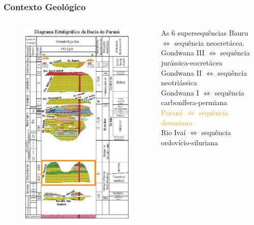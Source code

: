 \documentclass[aspectratio=10]{beamer} %
\begin{document}
\begin{frame}
\frametitle{Contexto Geológico}
\begin{columns}
\begin{column}{0.4\textwidth}
\begin{figure}
\includegraphics[scale=0.36]{Imagens/diagramaparana.png}
\end{figure}
\end{column}
\begin{column}{0.55\textwidth}
\begin{block}{As $6$ supersequências}
Bauru $\Longleftrightarrow$  sequência neocretácea.\\
Gondwana III $\Longleftrightarrow$ sequência jurássica-eocretácea\\
Gondwana II $\Longleftrightarrow$ sequência neotriássica \\
Gondwana I $\Longleftrightarrow$ sequência carbonífera-permiana\\ 
\textcolor{orange}{Paraná $\Longleftrightarrow$ sequência devoniana}\\
Rio Ivaí $\Longleftrightarrow$ sequência ordovício-siluriana\\
\cite{Vail_1977,assine_1994,milani_orogenias_1998}
\end{block}
\end{column}
\end{columns}
\end{frame}
\end{document}
